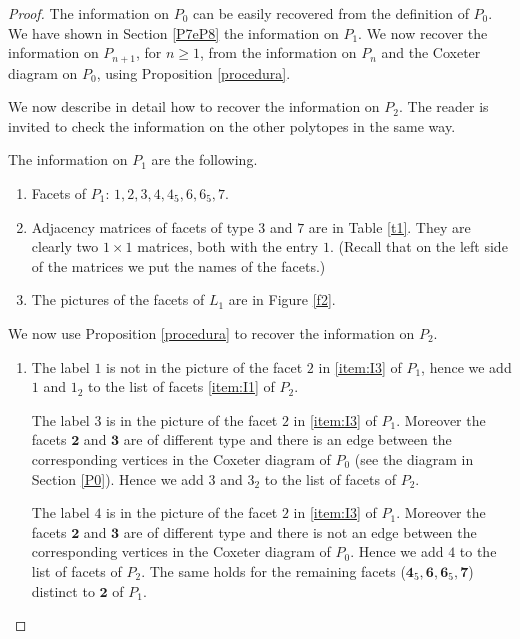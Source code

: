 \documentclass{amsart}
\theoremstyle{definition}
\theoremstyle{remark}
\newcommand{\lk}{L}
\begin{document}
\begin{proof}
    The information on $P_0$ can be easily recovered from the definition of $P_0$.
    We have shown in Section \ref{P7eP8} the information on $P_1$. We now recover the information on $P_{n+1}$, for $n\ge 1$, from the information on $P_n$ and the Coxeter diagram on $P_0$, using Proposition \ref{procedura}. 
    
    We now describe in detail how to recover the information on $P_2$. The reader is invited to check the information on the other polytopes in the same way.

    The information on $P_1$ are the following.

\begin{enumerate}
    \item[\ref{item:I1}] Facets of $P_1$: $1,2,3,4, 4_5,6, 6_5,7$.
    \item[\ref{item:I2}] Adjacency matrices of facets of type $3$ and $7$ are in Table \ref{t1}. They are clearly two $1 \times 1$ matrices, both with the entry $1$. (Recall that on the left side of the matrices we put the names of the facets.)


\item[\ref{item:I3}] The pictures of the facets of $\lk_1$ are in Figure \ref{f2}.
\end{enumerate}

We now use Proposition \ref{procedura} to recover the information on $P_2$.

\begin{enumerate}
    \item[\ref{item:I1}] The label $1$ is not in the picture of the facet $2$ in \ref{item:I3} of $P_1$, hence we add $1$ and $1_2$ to the list of facets \ref{item:I1} of $P_2$.

    The label $3$ is in the picture of the facet $2$ in \ref{item:I3} of $P_1$. Moreover the facets $\textbf{2}$ and $\textbf{3}$ are of different type and there is an edge between the corresponding vertices in the Coxeter diagram of $P_0$ (see the diagram in Section \ref{P0}). Hence we add $3$ and $3_2$ to the list of facets of $P_2$.

    The label $4$ is in the picture of the facet $2$ in \ref{item:I3} of $P_1$. Moreover the facets $\textbf{2}$ and $\textbf{3}$ are of different type and there is not an edge between the corresponding vertices in the Coxeter diagram of $P_0$. Hence we add $4$ to the list of facets of $P_2$. The same holds for the remaining facets ($\textbf{4}_5,\textbf{6},\textbf{6}_5,\textbf{7}$) distinct to $\textbf{2}$ of $P_1$.


\end{enumerate}
\end{proof}
\end{document}

